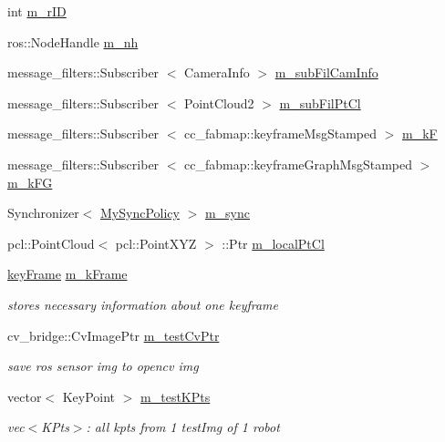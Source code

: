 \begin{DoxyCompactItemize}
\item 
int \hyperlink{classSyncListener_a8a56de9b7444cfe79845217863f50ac4}{m\-\_\-r\-I\-D}
\item 
ros\-::\-Node\-Handle \hyperlink{classSyncListener_a11af18cee056cd6558e11246c86d746c}{m\-\_\-nh}
\item 
message\-\_\-filters\-::\-Subscriber\*
$<$ \-Camera\-Info $>$ \hyperlink{classSyncListener_a8a2f8f014180ef641c4f23edc60f7f65}{m\-\_\-sub\-Fil\-Cam\-Info}
\item 
message\-\_\-filters\-::\-Subscriber\*
$<$ \-Point\-Cloud2 $>$ \hyperlink{classSyncListener_ac23b28241b0e85d1247f3bb116bdfeaf}{m\-\_\-sub\-Fil\-Pt\-Cl}
\item 
message\-\_\-filters\-::\-Subscriber\*
$<$ cc\-\_\-fabmap\-::keyframe\-Msg\-Stamped $>$ \hyperlink{classSyncListener_a283e6f9b1bb60cfe3fdf43787faddbb0}{m\-\_\-k\-F}
\item 
message\-\_\-filters\-::\-Subscriber\*
$<$ cc\-\_\-fabmap\-::keyframe\-Graph\-Msg\-Stamped $>$ \hyperlink{classSyncListener_a80a7b642798ea3441475ab9c57567345}{m\-\_\-k\-F\-G}
\item 
\-Synchronizer$<$ \hyperlink{classSyncListener_aff51e417f521f074342bc0344856d01e}{\-My\-Sync\-Policy} $>$ \hyperlink{classSyncListener_a2f352324b76a40e4e7b6cb560f527b2c}{m\-\_\-sync}
\item 
pcl\-::\-Point\-Cloud$<$ pcl\-::\-Point\-X\-Y\-Z $>$\*
\-::\-Ptr \hyperlink{classSyncListener_adf1510f0bffe657a07972b53265462a7}{m\-\_\-local\-Pt\-Cl}
\item 
\hyperlink{structkeyFrame}{key\-Frame} \hyperlink{classSyncListener_a4d09eece5d98418ba9f0d5e2b78739db}{m\-\_\-k\-Frame}
\begin{DoxyCompactList}\small\item\em stores necessary information about one keyframe \end{DoxyCompactList}\item 
cv\-\_\-bridge\-::\-Cv\-Image\-Ptr \hyperlink{classSyncListener_a86ba5fc553e1a656b7643c09e865aebb}{m\-\_\-test\-Cv\-Ptr}
\begin{DoxyCompactList}\small\item\em save ros sensor img to opencv img \end{DoxyCompactList}\item 
vector$<$ \-Key\-Point $>$ \hyperlink{classSyncListener_a6ebc46a18ad7a9acb1d00a7373959572}{m\-\_\-test\-K\-Pts}
\begin{DoxyCompactList}\small\item\em vec$<$\-K\-Pts$>$\-: all kpts from 1 test\-Img of 1 robot \end{DoxyCompactList}\item 

\end{DoxyCompactItemize}
